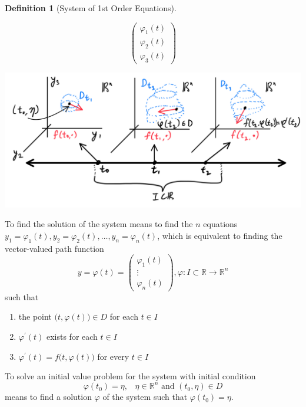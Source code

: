 \documentclass{article}
\theoremstyle{remark}
\theoremstyle{definition}
\newtheorem{definition}{Definition}[section]
\begin{document}
\begin{definition}[System of 1st Order Equations]
\begin{enumerate}
\[\begin{pmatrix}
    \varphi_1 (t)\\ \varphi_2(t) \\ \varphi_3(t) \end{pmatrix}\]
     \begin{center}
        \includegraphics[scale=0.26]{img/System_w_n_dim_Phase_Space.PNG}
    \end{center}
\end{enumerate}
To find the solution of the system means to find the $n$ equations $y_1 = \varphi_1 (t), y_2 = \varphi_2 (t), \ldots, y_n = \varphi_n (t)$, which is equivalent to finding the vector-valued path function 
\[y = \varphi(t) = \begin{pmatrix} \varphi_1 (t) \\ \vdots \\ \varphi_n (t) \end{pmatrix}, \varphi: I \subset \mathbb{R} \longrightarrow \mathbb{R}^n\]
such that
\begin{enumerate}
    \item the point $\big(t, \varphi(t)\big) \in D$ for each $t \in I$
    \item $\varphi^\prime (t)$ exists for each $t \in I$
    \item $\varphi^\prime (t) = f \big( t, \varphi(t)\big)$ for every $t \in I$ 
\end{enumerate}
To solve an initial value problem for the system with initial condition 
\[\varphi(t_0) = \eta, \;\;\; \eta \in \mathbb{R}^n \text{ and } (t_0, \eta) \in D\]
means to find a solution $\varphi$ of the system such that $\varphi(t_0) = \eta$. 
\end{definition}
\end{document}
